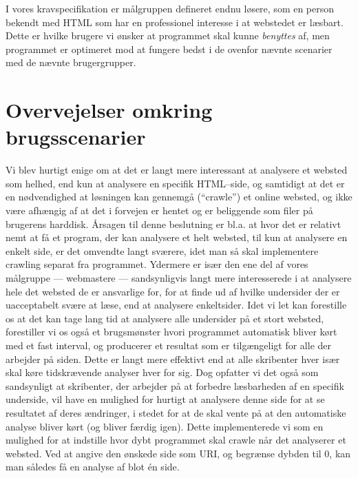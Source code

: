 \documentclass[a4paper,oneside]{memoir}
\begin{document}
I vores kravspecifikation er målgruppen defineret endnu løsere, som en
person bekendt med HTML som har en professionel interesse i at
webstedet er læsbart. Dette er hvilke brugere vi ønsker at programmet
skal kunne \textit{benyttes} af, men programmet er optimeret mod at
fungere bedst i de ovenfor nævnte scenarier med de nævnte
brugergrupper.

\section{Overvejelser omkring brugsscenarier}
\label{brugsovervejelser}
Vi blev hurtigt enige om at det er langt mere interessant at analysere
et websted som helhed, end kun at analysere en specifik HTML--side, og
samtidigt at det er en nødvendighed at løsningen kan gennemgå
(``crawle'') et online websted, og ikke være afhængig af at det i
forvejen er hentet og er beliggende som filer på brugerens
harddisk. Årsagen til denne beslutning er bl.a. at hvor det er
relativt nemt at få et program, der kan analysere et helt websted, til
kun at analysere en enkelt side, er det omvendte langt sværere, idet
man så skal implementere crawling separat fra programmet. Ydermere er
især den ene del af vores målgruppe --- webmastere --- sandsynligvis
langt mere interesserede i at analysere hele det websted de er
ansvarlige for, for at finde ud af hvilke undersider der er
uacceptabelt svære at læse, end at analysere enkeltsider. Idet vi let
kan forestille os at det kan tage lang tid at analysere alle
undersider på et stort websted, forestiller vi os også et brugsmønster
hvori programmet automatisk bliver kørt med et fast interval, og
producerer et resultat som er tilgængeligt for alle der arbejder på
siden. Dette er langt mere effektivt end at alle skribenter hver især
skal køre tidskrævende analyser hver for sig. Dog opfatter vi det også
som sandsynligt at skribenter, der arbejder på at forbedre læsbarheden
af en specifik underside, vil have en mulighed for hurtigt at
analysere denne side for at se resultatet af deres ændringer, i stedet
for at de skal vente på at den automatiske analyse bliver kørt (og
bliver færdig igen). Dette implementerede vi som en mulighed for at
indstille hvor dybt programmet skal crawle når det analyserer et
websted. Ved at angive den ønskede side som URI, og begrænse dybden
til 0, kan man således få en analyse af blot én side.
\end{document}
